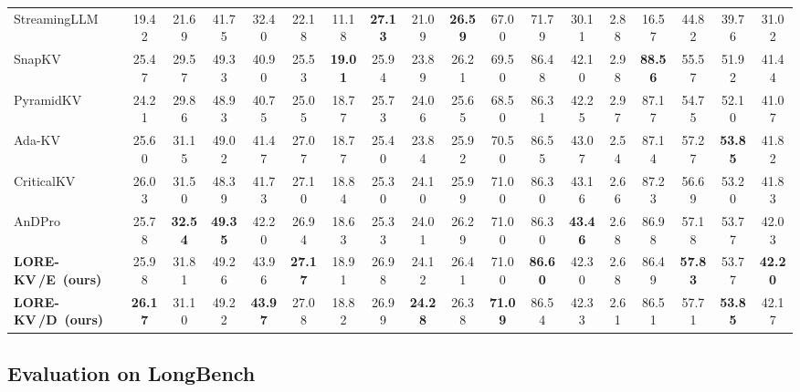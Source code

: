 \documentclass{article} %
\newcommand{\best}[1]{\textcolor{bestblue}{\textbf{#1}}}
\newcommand{\second}[1]{\textcolor{secondorange}{#1}}
\newcommand{\lorekvE}{LORE-KV\,/E}
\newcommand{\lorekvD}{LORE-KV\,/D}
\begin{document}
\begin{table}[t]
{\begin{tabular}{lccccccccccccccccc}
StreamingLLM 
& 19.42 & 21.69 & 41.75 
& 32.40 & 22.18 & 11.18 
& \best{27.13} & 21.09 & \best{26.59} 
& 67.00 & 71.79 & 30.11 
& 2.88 & 16.57 
& 44.82 & 39.76 
& 31.02 \\

SnapKV 
& 25.47 & 29.57 & \second{49.33} 
& 40.90 & 25.53 & \best{19.01} 
& 25.94 & 23.89 & 26.21 
& 69.50 & 86.48 & 42.10 
& \second{2.98} & \best{88.56} 
& 55.57 & 51.92 
& 41.44 \\

PyramidKV 
& 24.21 & 29.86 & 48.93 
& 40.75 & 25.05 & 18.77 
& 25.73 & 24.06 & 25.65 
& 68.50 & 86.31 & 42.25 
& 2.97 & 87.17 
& 54.75 & 52.10 
& 41.07 \\

Ada-KV 
& 25.60 & 31.15 & 49.02 
& 41.47 & 27.07 & 18.77 
& 25.40 & 23.84 & 25.92 
& 70.50 & \second{86.55} & 43.07 
& 2.54 & 87.14 
& 57.27 & \best{53.85} 
& 41.82 \\

CriticalKV 
& \second{26.03} & 31.50 & 48.39 
& 41.73 & \second{27.10} & 18.84 
& 25.30 & 24.10 & 25.99 
& \second{71.00} & 86.30 & \second{43.16} 
& 2.66 & \second{87.23} 
& 56.69 & 53.20 
& 41.83 \\

AnDPro 
& 25.78 & \best{32.54} & \best{49.35} 
& 42.20 & 26.94 & 18.63 
& 25.33 & 24.01 & 26.29 
& \second{71.00} & 86.30 & \best{43.46} 
& 2.68 & 86.98 
& 57.18 & \second{53.77} 
& 42.03 \\

\textbf{\lorekvE\ (ours)} 
& 25.98 & \second{31.81} & 49.26 
& \second{43.96} & \best{27.17} & \second{18.91} 
& 26.98 & \second{24.12} & \second{26.41} 
& \second{71.00} & \best{86.60} & 42.30 
& 2.68 & 86.49 
& \best{57.83} & \second{53.77} 
& \best{42.20} \\

\textbf{\lorekvD\ (ours)} 
& \best{26.17} & 31.10 & 49.22 
& \best{43.97} & 27.08 & 18.82 
& \second{26.99} & \best{24.28} & 26.38 
& \best{71.09} & 86.54 & 42.33 
& 2.61 & 86.51 
& \second{57.71} & \best{53.85} 
& \second{42.17} \\

\bottomrule
\end{tabular}%
}
\end{table}

\subsection{Evaluation on LongBench}
\label{subsec:longbench}
\end{document}
